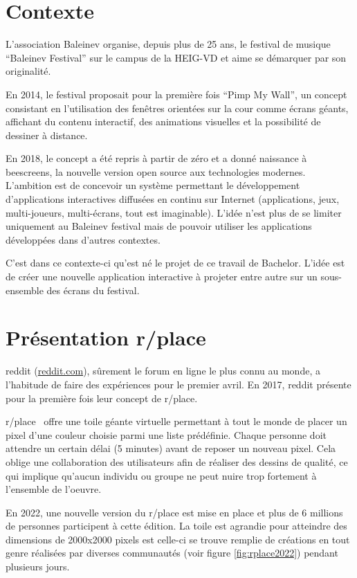 \section{Contexte}
L'association Baleinev organise, depuis plus de 25 ans, le festival de musique “Baleinev Festival” sur le campus de la HEIG-VD et aime se démarquer par son originalité.

En 2014, le festival proposait pour la première fois “Pimp My Wall”, un concept consistant en l'utilisation des fenêtres orientées sur la cour comme écrans géants, affichant du contenu interactif, des animations visuelles et la possibilité de dessiner à distance.

En 2018, le concept a été repris à partir de zéro et a donné naissance à \gls{beescreens}, la nouvelle version open source aux technologies modernes. L'ambition est de concevoir un système permettant le développement d'applications interactives diffusées en continu sur Internet (applications, jeux, multi-joueurs, multi-écrans, tout est imaginable). L'idée n'est plus de se limiter uniquement au Baleinev festival mais de pouvoir utiliser les applications développées dans d'autres contextes.

C'est dans ce contexte-ci qu'est né le projet de ce travail de Bachelor. L'idée est de créer une nouvelle application interactive à projeter entre autre sur un sous-ensemble des écrans du festival.

\section{Présentation r/place}
\gls{reddit} (\href{https://www.reddit.com}{reddit.com}), sûrement le forum en ligne le plus connu au monde, a l'habitude de faire des expériences pour le premier avril. En 2017, \gls{reddit} présente pour la première fois leur concept de r/place.

r/place~\cite{rplace} offre une toile géante virtuelle permettant à tout le monde de placer un pixel d'une couleur choisie parmi une liste prédéfinie. Chaque personne doit attendre un certain délai (5 minutes) avant de reposer un nouveau pixel. Cela oblige une collaboration des utilisateurs afin de réaliser des dessins de qualité, ce qui implique qu'aucun individu ou groupe ne peut nuire trop fortement à l'ensemble de l'oeuvre.

En 2022, une nouvelle version du r/place est mise en place et plus de 6 millions de personnes participent à cette édition. La toile est agrandie pour atteindre des dimensions de 2000x2000 pixels est celle-ci se trouve remplie de créations en tout genre réalisées par diverses communautés (voir figure \ref{fig:rplace2022}) pendant plusieurs jours.

